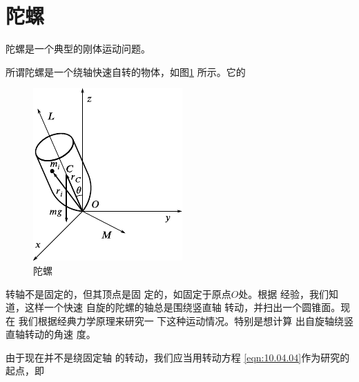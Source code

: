 \section[陀螺]{陀\qquad 螺}\label{sec:10.05}

陀螺是一个典型的刚体运动问题。

所谓陀螺是一个绕轴快速自转的物体，如图\ref{fig:10.21} 所示。它的
\begin{figure}
    \centering
    \includegraphics{figure/fig10.21}
    \caption{陀螺}
    \label{fig:10.21}
\end{figure}
转轴不是固定的，但其顶点是固
定的，如固定于原点$ O $处。根据
经验，我们知道，这样一个快速
自旋的陀螺的轴总是围绕竖直轴
转动，并扫出一个圆锥面。现在
我们根据经典力学原理来研究一
下这种运动情况。特别是想计算
出自旋轴绕竖直轴转动的角速
度。

由于现在并不是绕固定轴
的转动，我们应当用转动方程
\eqref{eqn:10.04.04}作为研究的起点，即

